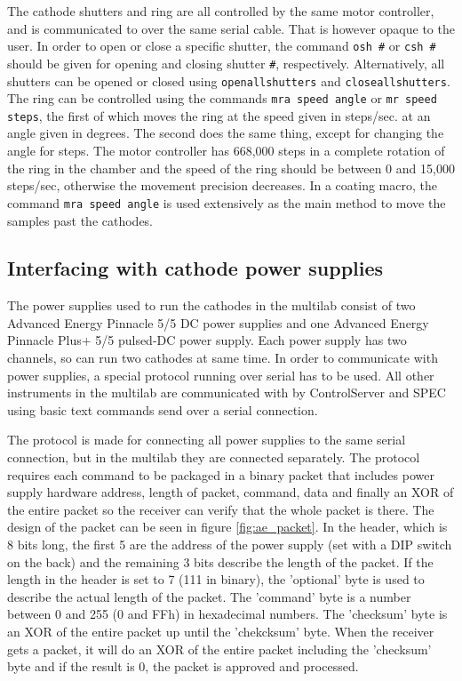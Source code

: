 The cathode shutters and ring are all controlled by the same motor controller, and is communicated to over the same serial cable. That is however opaque to the user. In order to open or close a specific shutter, the command \verb'osh #' or \verb'csh #' should be given for opening and closing shutter \verb'#', respectively. Alternatively, all shutters can be opened or closed using \verb'openallshutters' and \verb'closeallshutters'. The ring can be controlled using the commands \verb'mra speed angle' or \verb'mr speed steps', the first of which moves the ring at the speed given in steps/sec. at an angle given in degrees. The second does the same thing, except for changing the angle for steps. The motor controller has 668,000 steps in a complete rotation of the ring in the chamber and the speed of the ring should be between 0 and 15,000 steps/sec, otherwise the movement precision decreases. In a coating macro, the command \verb'mra speed angle' is used extensively as the main method to move the samples past the cathodes.%

\subsection{Interfacing with cathode power supplies}
The power supplies used to run the cathodes in the multilab consist of two Advanced Energy Pinnacle 5/5 DC power supplies and one Advanced Energy Pinnacle Plus+ 5/5 pulsed-DC power supply. Each power supply has two channels, so can run two cathodes at same time. In order to communicate with power supplies, a special protocol running over serial has to be used. All other instruments in the multilab are communicated with by ControlServer and SPEC using basic text commands send over a serial connection.

The protocol is made for connecting all power supplies to the same serial connection, but in the multilab they are connected separately. The protocol requires each command to be packaged in a binary packet that includes power supply hardware address, length of packet, command, data and finally an XOR of the entire packet so the receiver can verify that the whole packet is there. The design of the packet can be seen in figure \ref{fig:ae_packet}. In the header, which is 8 bits long, the first 5 are the address of the power supply (set with a DIP switch on the back) and the remaining 3 bits describe the length of the packet. If the length in the header is set to 7 (111 in binary), the 'optional' byte is used to describe the actual length of the packet. The 'command' byte is a number between 0 and 255 (0 and FFh) in hexadecimal numbers. The 'checksum' byte is an XOR of the entire packet up until the 'chekcksum' byte. When the receiver gets a packet, it will do an XOR of the entire packet including the 'checksum' byte and if the result is 0, the packet is approved and processed.

